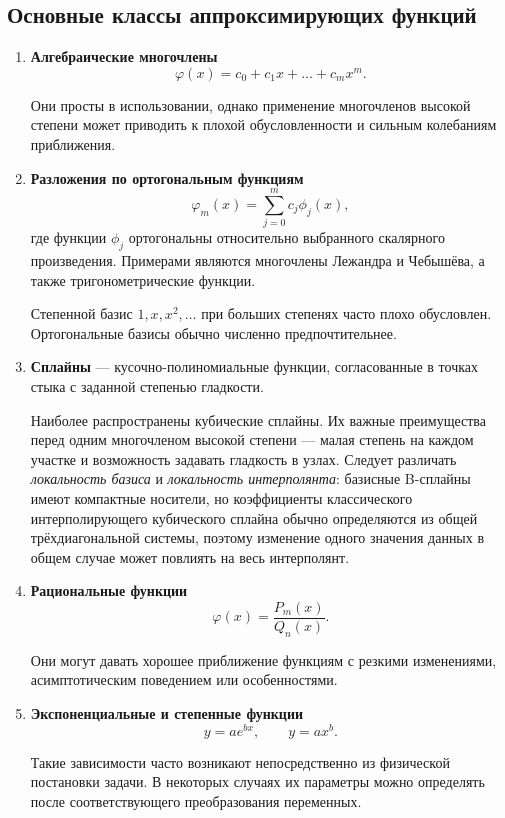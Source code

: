 \subsection{Основные классы аппроксимирующих функций}

\begin{enumerate}
	\item \textbf{Алгебраические многочлены}
	\[
	\varphi(x)
	=
	c_0+c_1x+\ldots+c_mx^m.
	\]
	
	Они просты в использовании, однако применение многочленов высокой степени может приводить к плохой обусловленности и сильным колебаниям приближения.
	
	\item \textbf{Разложения по ортогональным функциям}
	\[
	\varphi_m(x)
	=
	\sum_{j=0}^{m}c_j\phi_j(x),
	\]
	где функции $\phi_j$ ортогональны относительно выбранного скалярного произведения. Примерами являются многочлены Лежандра и Чебышёва, а также тригонометрические функции.
	
	Степенной базис $1,x,x^2,\ldots$ при больших степенях часто плохо обусловлен. Ортогональные базисы обычно численно предпочтительнее.
	
	\item \textbf{Сплайны} --- кусочно-полиномиальные функции, согласованные в точках стыка с заданной степенью гладкости.
	
	Наиболее распространены кубические сплайны. Их важные преимущества перед одним многочленом высокой степени --- малая степень на каждом участке и возможность задавать гладкость в узлах. Следует различать \emph{локальность базиса} и \emph{локальность интерполянта}: базисные B-сплайны имеют компактные носители, но коэффициенты классического интерполирующего кубического сплайна обычно определяются из общей трёхдиагональной системы, поэтому изменение одного значения данных в общем случае может повлиять на весь интерполянт.
	
	\item \textbf{Рациональные функции}
	\[
	\varphi(x)=\frac{P_m(x)}{Q_n(x)}.
	\]
	
	Они могут давать хорошее приближение функциям с резкими изменениями, асимптотическим поведением или особенностями.
	
	\item \textbf{Экспоненциальные и степенные функции}
	\[
	y=ae^{bx},
	\qquad
	y=ax^b.
	\]
	
	Такие зависимости часто возникают непосредственно из физической постановки задачи. В некоторых случаях их параметры можно определять после соответствующего преобразования переменных.
\end{enumerate}

